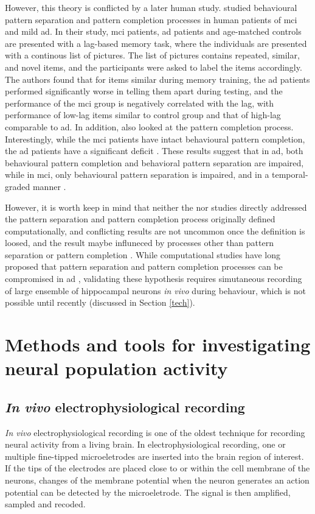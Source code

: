 However, this theory is conflicted by a later human study. \citet{ally13} studied behavioural pattern separation and pattern completion processes in human patients of \gls{mci} and mild \gls{ad}. In their study, \gls{mci} patients, \gls{ad} patients and age-matched controls are presented with a lag-based memory task, where the individuals are presented with a continous list of pictures. The list of pictures contains repeated, similar, and novel items, and the participants were asked to label the items accordingly. The authors found that for items similar during memory training, the \gls{ad} patients performed significantly worse in telling them apart during testing, and the performance of the \gls{mci} group is negatively correlated with the lag, with performance of low-lag items similar to control group and that of high-lag comparable to \gls{ad}.  In addition, \citet{ally13} also looked at the pattern completion process. Interestingly, while the \gls{mci} patients have intact behavioural pattern completion, the \gls{ad} patients have a significant deficit \citep{ally13}. These results suggest that in \gls{ad}, both behavioural pattern completion and behavioral pattern separation are impaired, while in \gls{mci}, only behavioural pattern separation is impaired, and in a temporal-graded manner \citep{ally13}.

However, it is worth keep in mind that neither the \citet{palmer11} nor \citet{ally13} studies directly addressed the pattern separation and pattern completion process originally defined computationally, and conflicting results are not uncommon once the definition is loosed, and the result maybe influneced by processes other than pattern separation or pattern completion \citep{santoro13}. While computational studies have long proposed that pattern separation and pattern completion processes can be compromised in \gls{ad} \citep{horn93, hasselmo94, hasselmo97}, validating these hypothesis requires simutaneous recording of large ensemble of hippocampal neurons \textit{in vivo} during behaviour, which is not possible until recently (discussed in Section \ref{tech}).  

\section{Methods and tools for investigating neural population activity \label{tech}}
\subsection{\textit{In vivo} electrophysiological recording}
\textit{In vivo} electrophysiological recording is one of the oldest technique for recording neural activity from a living brain. In electrophysiological recording, one or multiple fine-tipped microeletrodes are inserted into the brain region of interest. If the tips of the electrodes are placed close to or within the cell membrane of the neurons, changes of the membrane potential when the neuron generates an action potential can be detected by the microeletrode. The signal is then amplified, sampled and recoded. 


